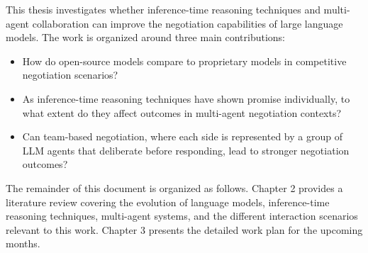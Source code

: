 This thesis investigates whether inference-time reasoning techniques and multi-agent collaboration can improve the negotiation capabilities of large language models. The work is organized around three main contributions:

\begin{itemize}
    \item How do open-source models compare to proprietary models in competitive negotiation scenarios?
    \item As inference-time reasoning techniques have shown promise individually, to what extent do they affect outcomes in multi-agent negotiation contexts?
    \item Can team-based negotiation, where each side is represented by a group of LLM agents that deliberate before responding, lead to stronger negotiation outcomes? 
\end{itemize}


The remainder of this document is organized as follows. Chapter 2 provides a literature review covering the evolution of language models, inference-time reasoning techniques, multi-agent systems, and the different interaction scenarios relevant to this work. Chapter 3 presents the detailed work plan for the upcoming months.